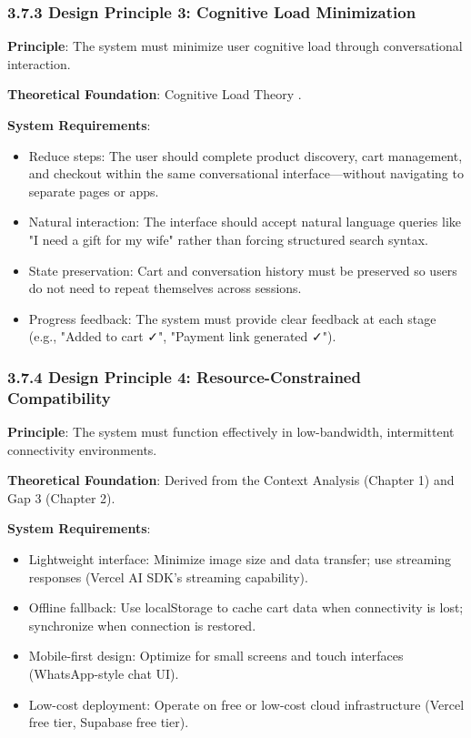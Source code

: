 \documentclass[12pt,a4paper]{article}
\begin{document}
\subsubsection{3.7.3 Design Principle 3: Cognitive Load Minimization}

\textbf{Principle}: The system must minimize user cognitive load through conversational interaction.

\textbf{Theoretical Foundation}: Cognitive Load Theory \citep{sweller1988}.

\textbf{System Requirements}:

\begin{itemize}
    \item Reduce steps: The user should complete product discovery, cart management, and checkout within the same conversational interface---without navigating to separate pages or apps.
    \item Natural interaction: The interface should accept natural language queries like "I need a gift for my wife" rather than forcing structured search syntax.
    \item State preservation: Cart and conversation history must be preserved so users do not need to repeat themselves across sessions.
    \item Progress feedback: The system must provide clear feedback at each stage (e.g., "Added to cart ✓", "Payment link generated ✓").
\end{itemize}

\subsubsection{3.7.4 Design Principle 4: Resource-Constrained Compatibility}

\textbf{Principle}: The system must function effectively in low-bandwidth, intermittent connectivity environments.

\textbf{Theoretical Foundation}: Derived from the Context Analysis (Chapter 1) and Gap 3 (Chapter 2).

\textbf{System Requirements}:

\begin{itemize}
    \item Lightweight interface: Minimize image size and data transfer; use streaming responses (Vercel AI SDK's streaming capability).
    \item Offline fallback: Use localStorage to cache cart data when connectivity is lost; synchronize when connection is restored.
    \item Mobile-first design: Optimize for small screens and touch interfaces (WhatsApp-style chat UI).
    \item Low-cost deployment: Operate on free or low-cost cloud infrastructure (Vercel free tier, Supabase free tier).
\end{itemize}
\end{document}
